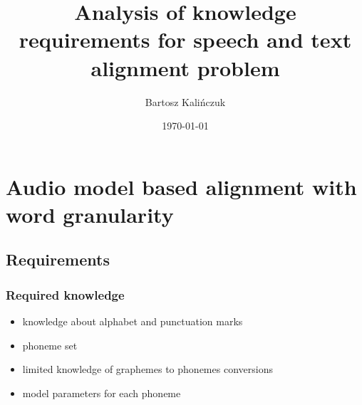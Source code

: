 \documentclass[]{beamer}
\title[Speech and text alignment]{Analysis of knowledge requirements for speech and text alignment problem}
\author{Bartosz Kalińczuk}
\date{\today}
\begin{document}
\begin{frame}
  \titlepage
\end{frame}

\section[Outline]{}

\begin{frame}
  \tableofcontents[hideallsubsections]
\end{frame}


\section{Audio model based alignment with word granularity}
\subsection{Requirements}
\begin{frame}
    \frametitle{Required knowledge}
    \begin{itemize}
        \item knowledge about alphabet and punctuation marks
        \item phoneme set
        \item limited knowledge of graphemes to phonemes conversions
        \item model parameters for each phoneme
    \end{itemize}
\end{frame}
\end{document}
